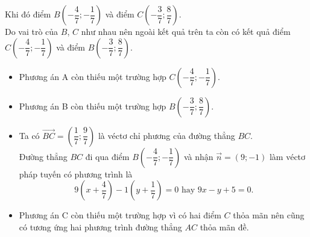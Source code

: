 \begin{ex}
{		Khi đó điểm $B\left(-\dfrac{4}{7};-\dfrac{1}{7}\right)$ và điểm $C\left(-\dfrac{3}{7};\dfrac{8}{7}\right)$. \\
		Do vai trò của $B$, $C$ như nhau nên ngoài kết quả trên ta còn có kết quả điểm $C\left(-\dfrac{4}{7};-\dfrac{1}{7}\right)$ và điểm $B\left(-\dfrac{3}{7};\dfrac{8}{7}\right)$.  
		\begin{itemize}
			\item Phương án A còn thiếu một trường hợp $C\left(-\dfrac{4}{7};-\dfrac{1}{7}\right)$.
			\item Phương án B còn thiếu một trường hợp $B\left(-\dfrac{3}{7};\dfrac{8}{7}\right)$.
			\item Ta có $\overrightarrow{BC}=\left(\dfrac{1}{7};\dfrac{9}{7}\right)$ là véctơ chỉ phương của đường thẳng $BC$.\\
			Đường thẳng $BC$ đi qua điểm $B\left(-\dfrac{4}{7};-\dfrac{1}{7}\right)$ và nhận $\overrightarrow{n}=(9;-1)$ làm véctơ pháp tuyến có phương trình là
			$$9\left(x+\dfrac{4}{7}\right)-1\left(y+\dfrac{1}{7}\right)=0 \text{ hay } 9x-y+5=0.$$
			\item Phương án C còn thiếu một trường hợp vì có hai điểm $C$ thỏa mãn nên cũng có tương ứng hai phương trình đường thẳng $AC$ thỏa mãn đề.
		\end{itemize}
	}
\end{ex}

